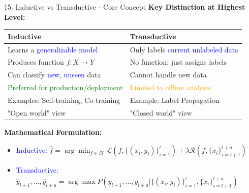 \documentclass[8pt]{beamer}
\begin{document}
	
	\begin{frame}{15. Inductive vs Transductive - Core Concept}
		\fontsize{6.5}{7.5}\selectfont
		\textbf{Key Distinction at Highest Level:}
		
		\begin{tabular}{|p{4.0cm}|p{5.0cm}|}
			\hline
			\textbf{Inductive} & \textbf{Transductive} \\
			\hline
			Learns a \textcolor{blue}{generalizable model} & Only labels \textcolor{blue}{current unlabeled data} \\
			\hline
			Produces function $f: X \rightarrow Y$ & No function; just assigns labels \\
			\hline
			Can classify \textcolor{blue}{new, unseen} data & Cannot handle new data \\
			\hline
			\textcolor{green}{Preferred for production/deployment} & \textcolor{orange}{Limited to offline analysis} \\
			\hline
			Examples: Self-training, Co-training & Example: Label Propagation \\
			\hline
			"Open world" view & "Closed world" view \\
			\hline
		\end{tabular}
		
		\textbf{Mathematical Formulation:}
		\begin{itemize}
			\item \textcolor{blue}{Inductive:} $\hat{f} = \arg\min_{f \in \mathcal{H}} \mathcal{L}(f, \{(x_i,y_i)\}_{i=1}^l) + \lambda \mathcal{R}(f, \{x_i\}_{i=l+1}^{l+u})$
			\item \textcolor{blue}{Transductive:} $\hat{y}_{l+1},...,\hat{y}_{l+u} = \arg\max P(y_{l+1},...,y_{l+u} | \{(x_i,y_i)\}_{i=1}^l, \{x_i\}_{i=l+1}^{l+u})$
		\end{itemize}
	\end{frame}
	
\end{document}
